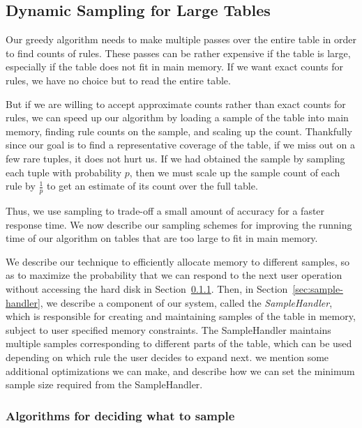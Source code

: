 

\subsection{Dynamic Sampling for Large Tables}\label{sec:sampling}

Our greedy algorithm needs to make multiple passes over the entire table in order to find counts of rules. These passes can be rather expensive if the table is large, especially if the table does not fit in main memory. If we want exact counts for rules, we have no choice but to read the entire table. 

But if we are willing to accept approximate counts rather than exact counts for rules, we can speed up our algorithm by loading a sample of the table into main memory, finding rule counts on the sample, and scaling up the count. Thankfully since our goal is to find a representative coverage of the table, if we miss out on a few rare tuples, it does not hurt us. If we had obtained the sample by sampling each tuple with probability $p$, then we must scale up the sample count of each rule by $\frac{1}{p}$ to get an estimate of its count over the full table. 

Thus, we use sampling to trade-off a small amount of accuracy for a faster response time. We now describe our sampling schemes for improving the running time of our algorithm on tables that are too large to fit in main memory. 

We describe our technique to efficiently allocate memory to different samples, so as to maximize the probability that we can respond to the next user operation without accessing the hard disk in Section~\ref{sec:sampling_algorithms}. 
Then, in Section~\ref{sec:sample-handler}, we describe a component of our system, called the {\em SampleHandler}, which is responsible for creating and maintaining samples of the table in memory, subject to user specified memory constraints. The SampleHandler maintains multiple samples corresponding to different parts of the table, which can be used depending on which rule the user decides to expand next. 
we mention some additional optimizations we can make, and
describe how we can set the minimum sample size required from the SampleHandler.

\subsubsection{Algorithms for deciding what to sample}\label{sec:sampling_algorithms}

